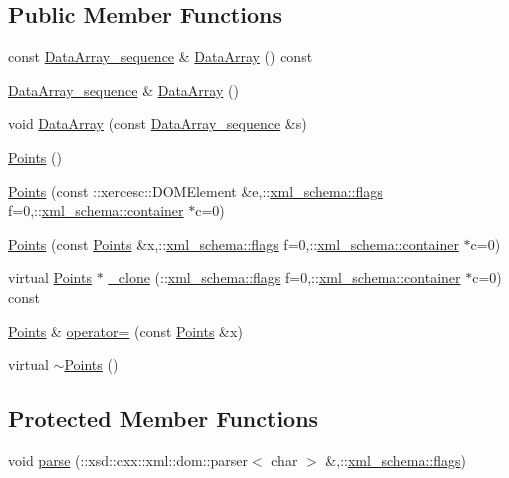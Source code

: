 \subsection*{Public Member Functions}
\begin{DoxyCompactItemize}
\item 
const \hyperlink{classPoints_ac8b51dcf0e7659ca61ff9b9d24051016}{Data\+Array\+\_\+sequence} \& \hyperlink{classPoints_a86c60a0068ebdb8d3e8cbe9fa8f35f55}{Data\+Array} () const 
\item 
\hyperlink{classPoints_ac8b51dcf0e7659ca61ff9b9d24051016}{Data\+Array\+\_\+sequence} \& \hyperlink{classPoints_a3fdfb1b1b2f1221ad50ba5087826177c}{Data\+Array} ()
\item 
void \hyperlink{classPoints_aa22a86fe31d5f903be59dda3de92bb67}{Data\+Array} (const \hyperlink{classPoints_ac8b51dcf0e7659ca61ff9b9d24051016}{Data\+Array\+\_\+sequence} \&s)
\item 
\hyperlink{classPoints_aa4e68083d98bd04233c9753dfe1e46ab}{Points} ()
\item 
\hyperlink{classPoints_a36a1ac8ea9ac092adff2888915e81304}{Points} (const \+::xercesc\+::\+D\+O\+M\+Element \&e,\+::\hyperlink{namespacexml__schema_a0612287d030cb2732d31a45b258fdc87}{xml\+\_\+schema\+::flags} f=0,\+::\hyperlink{namespacexml__schema_ada9aa30dc722e93ee2ed7243085402a5}{xml\+\_\+schema\+::container} $\ast$c=0)
\item 
\hyperlink{classPoints_ad49b51469dc53b028c244a88bd9fb08b}{Points} (const \hyperlink{classPoints}{Points} \&x,\+::\hyperlink{namespacexml__schema_a0612287d030cb2732d31a45b258fdc87}{xml\+\_\+schema\+::flags} f=0,\+::\hyperlink{namespacexml__schema_ada9aa30dc722e93ee2ed7243085402a5}{xml\+\_\+schema\+::container} $\ast$c=0)
\item 
virtual \hyperlink{classPoints}{Points} $\ast$ \hyperlink{classPoints_a5dff673c4b4a59465aee3ede80328ae9}{\+\_\+clone} (\+::\hyperlink{namespacexml__schema_a0612287d030cb2732d31a45b258fdc87}{xml\+\_\+schema\+::flags} f=0,\+::\hyperlink{namespacexml__schema_ada9aa30dc722e93ee2ed7243085402a5}{xml\+\_\+schema\+::container} $\ast$c=0) const 
\item 
\hyperlink{classPoints}{Points} \& \hyperlink{classPoints_abf6e94122cfc53e80543249d72cb87c2}{operator=} (const \hyperlink{classPoints}{Points} \&x)
\item 
virtual \hyperlink{classPoints_a9d56d7dc8b6a6f492e07d354eb379c12}{$\sim$\+Points} ()
\end{DoxyCompactItemize}
\subsection*{Protected Member Functions}
\begin{DoxyCompactItemize}
\item 
void \hyperlink{classPoints_a444657f907a3ae7bb2e36a6069501a3f}{parse} (\+::xsd\+::cxx\+::xml\+::dom\+::parser$<$ char $>$ \&,\+::\hyperlink{namespacexml__schema_a0612287d030cb2732d31a45b258fdc87}{xml\+\_\+schema\+::flags})
\end{DoxyCompactItemize}

